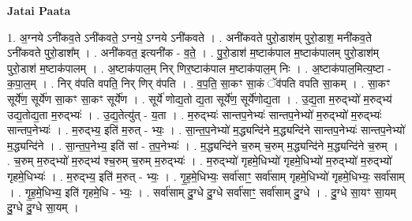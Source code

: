\documentclass[17pt]{extarticle}
\begin{document}
\textbf{Jatai Paata} \newline

1. अ॒ग्नये ऽनी॑कव॒ते ऽनी॑कवते॒ ऽग्नये॒ ऽग्नये ऽनी॑कवते । . अनी॑कवते पुरो॒डाश॑म् पुरो॒डाश॒ मनी॑कव॒ते ऽनी॑कवते पुरो॒डाश᳚म् । . अनी॑कवत॒ इत्यनी॑क - व॒ते॒ । . पु॒रो॒डाश॑ म॒ष्टाक॑पाल म॒ष्टाक॑पालम् पुरो॒डाश॑म् पुरो॒डाश॑ म॒ष्टाक॑पालम् । . अ॒ष्टाक॑पाल॒म् निर् णिर॒ष्टाक॑पाल म॒ष्टाक॑पाल॒म् निः । . अ॒ष्टाक॑पाल॒मित्य॒ष्टा - क॒पा॒ल॒म् । . निर् व॑पति वपति॒ निर् णिर् व॑पति । . व॒प॒ति॒ सा॒कꣳ सा॒कं ॅव॑पति वपति सा॒कम् । . सा॒कꣳ सूर्ये॑ण॒ सूर्ये॑ण सा॒कꣳ सा॒कꣳ सूर्ये॑ण । . सूर्ये॑ णोद्य॒तो द्य॒ता सूर्ये॑ण॒ सूर्ये॑णोद्य॒ता । . उ॒द्य॒ता म॒रुद्भ्यो॑ म॒रुद्भ्य॑ उद्य॒तोद्य॒ता म॒रुद्भ्यः॑ । . उ॒द्य॒तेत्यु॑त् - य॒ता । . म॒रुद्भ्यः॑ सान्तप॒नेभ्यः॑ सान्तप॒नेभ्यो॑ म॒रुद्भ्यो॑ म॒रुद्भ्यः॑ सान्तप॒नेभ्यः॑ । . म॒रुद्भ्य॒ इति॑ म॒रुत् - भ्यः॒ । . सा॒न्त॒प॒नेभ्यो॑ म॒द्ध्यन्दि॑ने म॒द्ध्यन्दि॑ने सान्तप॒नेभ्यः॑ सान्तप॒नेभ्यो॑ म॒द्ध्यन्दि॑ने । . सा॒न्त॒प॒नेभ्य॒ इति॑ सां - त॒प॒नेभ्यः॑ । . म॒द्ध्यन्दि॑ने च॒रुम् च॒रुम् म॒द्ध्यन्दि॑ने म॒द्ध्यन्दि॑ने च॒रुम् । . च॒रुम् म॒रुद्भ्यो॑ म॒रुद्भ्य॑ श्च॒रुम् च॒रुम् म॒रुद्भ्यः॑ । . म॒रुद्भ्यो॑ गृहमे॒धिभ्यो॑ गृहमे॒धिभ्यो॑ म॒रुद्भ्यो॑ म॒रुद्भ्यो॑ गृहमे॒धिभ्यः॑ । . म॒रुद्भ्य॒ इति॑ म॒रुत् - भ्यः॒ । . गृ॒ह॒मे॒धिभ्यः॒ सर्वा॑साꣳ॒॒ सर्वा॑साम् गृहमे॒धिभ्यो॑ गृहमे॒धिभ्यः॒ सर्वा॑साम् । . गृ॒ह॒मे॒धिभ्य॒ इति॑ गृहमे॒धि - भ्यः॒ । . सर्वा॑साम् दु॒ग्धे दु॒ग्धे सर्वा॑साꣳ॒॒ सर्वा॑साम् दु॒ग्धे । . दु॒ग्धे सा॒यꣳ सा॒यम् दु॒ग्धे दु॒ग्धे सा॒यम् । \newline
\end{document}
